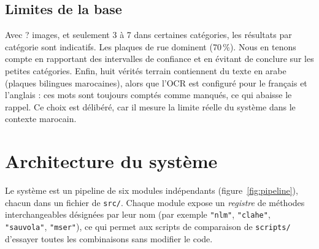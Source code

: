 \documentclass[11pt,a4paper]{article}
\newcommand{\nbImages}{?}\newcommand{\configFinale}{?}\newcommand{\baseFmed}{?}%
\newcommand{\fichier}[1]{\texttt{#1}}
\begin{document}
\subsection{Limites de la base}
Avec \nbImages{} images, et seulement 3 à 7 dans certaines catégories, les résultats par catégorie sont indicatifs. Les plaques de rue dominent (70\,\%). Nous en tenons compte en rapportant des intervalles de confiance et en évitant de conclure sur les petites catégories. Enfin, huit vérités terrain contiennent du texte en arabe (plaques bilingues marocaines), alors que l'OCR est configuré pour le français et l'anglais : ces mots sont toujours comptés comme manqués, ce qui abaisse le rappel. Ce choix est délibéré, car il mesure la limite réelle du système dans le contexte marocain.

\section{Architecture du système}

Le système est un pipeline de six modules indépendants (figure~\ref{fig:pipeline}), chacun dans un fichier de \fichier{src/}. Chaque module expose un \emph{registre} de méthodes interchangeables désignées par leur nom (par exemple \texttt{"nlm"}, \texttt{"clahe"}, \texttt{"sauvola"}, \texttt{"mser"}), ce qui permet aux scripts de comparaison de \fichier{scripts/} d'essayer toutes les combinaisons sans modifier le code.
\end{document}
